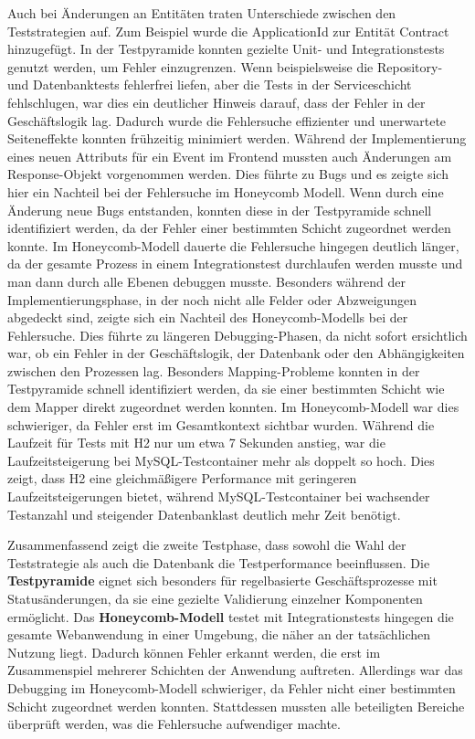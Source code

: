 Auch bei Änderungen an Entitäten traten Unterschiede zwischen den Teststrategien auf. Zum Beispiel wurde die ApplicationId zur Entität Contract hinzugefügt. In der Testpyramide konnten gezielte Unit- und Integrationstests genutzt werden, um Fehler einzugrenzen. Wenn beispielsweise die Repository- und Datenbanktests fehlerfrei liefen, aber die Tests in der Serviceschicht fehlschlugen, war dies ein deutlicher Hinweis darauf, dass der Fehler in der Geschäftslogik lag. Dadurch wurde die Fehlersuche effizienter und unerwartete Seiteneffekte konnten frühzeitig minimiert werden. Während der Implementierung eines neuen Attributs für ein Event im Frontend mussten auch Änderungen am Response-Objekt vorgenommen werden. Dies führte zu Bugs und es zeigte sich hier ein Nachteil bei der Fehlersuche im Honeycomb Modell. Wenn durch eine Änderung neue Bugs entstanden, konnten diese in der Testpyramide schnell identifiziert werden, da der Fehler einer bestimmten Schicht zugeordnet werden konnte. Im Honeycomb-Modell dauerte die Fehlersuche hingegen deutlich länger, da der gesamte Prozess in einem Integrationstest durchlaufen werden musste und man dann durch alle Ebenen debuggen musste. Besonders während der Implementierungsphase, in der noch nicht alle Felder oder Abzweigungen abgedeckt sind, zeigte sich ein Nachteil des Honeycomb-Modells bei der Fehlersuche. Dies führte zu längeren Debugging-Phasen, da nicht sofort ersichtlich war, ob ein Fehler in der Geschäftslogik, der Datenbank oder den Abhängigkeiten zwischen den Prozessen lag. Besonders Mapping-Probleme konnten in der Testpyramide schnell identifiziert werden, da sie einer bestimmten Schicht wie dem Mapper direkt zugeordnet werden konnten. Im Honeycomb-Modell war dies schwieriger, da Fehler erst im Gesamtkontext sichtbar wurden.
Während die Laufzeit für Tests mit H2 nur um etwa 7 Sekunden anstieg, war die Laufzeitsteigerung bei MySQL-Testcontainer mehr als doppelt so hoch. Dies zeigt, dass H2 eine gleichmäßigere Performance mit geringeren Laufzeitsteigerungen bietet, während MySQL-Testcontainer bei wachsender Testanzahl und steigender Datenbanklast deutlich mehr Zeit benötigt.

Zusammenfassend zeigt die zweite Testphase, dass sowohl die Wahl der Teststrategie als auch die Datenbank die Testperformance beeinflussen. Die \textbf{Testpyramide} eignet sich besonders für regelbasierte Geschäftsprozesse mit Statusänderungen, da sie eine gezielte Validierung einzelner Komponenten ermöglicht. Das \textbf{Honeycomb-Modell} testet mit Integrationstests hingegen die gesamte Webanwendung in einer Umgebung, die näher an der tatsächlichen Nutzung liegt. Dadurch können Fehler erkannt werden, die erst im Zusammenspiel mehrerer Schichten der Anwendung auftreten. Allerdings war das Debugging im Honeycomb-Modell schwieriger, da Fehler nicht einer bestimmten Schicht zugeordnet werden konnten. Stattdessen mussten alle beteiligten Bereiche überprüft werden, was die Fehlersuche aufwendiger machte.



